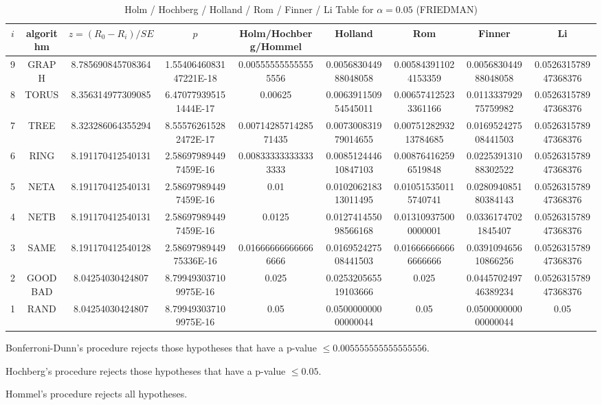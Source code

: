\documentclass[a4paper,10pt]{article}
\begin{document}
\begin{landscape}
\begin{table}[!htp]
\begin{tabular}{
|r|r|r|r|r|r|r|r|r|r|r|}
\end{tabular}
\end{table}

\newpage

\begin{table}[!htp]
\centering\scriptsize
\caption{Holm / Hochberg / Holland / Rom / Finner / Li Table for $\alpha=0.05$ (FRIEDMAN)}
\begin{tabular}{ccccccccc}
$i$&algorithm&$z=(R_0 - R_i)/SE$&$p$&Holm/Hochberg/Hommel&Holland&Rom&Finner&Li\\
\hline
9& GRAPH&8.785690845708364&1.5540646083147221E-18&0.005555555555555556&0.005683044988048058&0.005843911024153359&0.005683044988048058&0.052631578947368376\\
8& TORUS&8.356314977309085&6.470779395151444E-17&0.00625&0.006391150954545011&0.006574125233361166&0.011333792975759982&0.052631578947368376\\
7& TREE&8.323286064355294&8.555762615282472E-17&0.0071428571428571435&0.007300831979014655&0.0075128293213784685&0.016952427508441503&0.052631578947368376\\
6& RING&8.191170412540131&2.586979894497459E-16&0.008333333333333333&0.008512444610847103&0.008764162596519848&0.022539131088302522&0.052631578947368376\\
5& NETA&8.191170412540131&2.586979894497459E-16&0.01&0.010206218313011495&0.010515350115740741&0.028094085180384143&0.052631578947368376\\
4& NETB&8.191170412540131&2.586979894497459E-16&0.0125&0.012741455098566168&0.013109375000000001&0.03361747021845407&0.052631578947368376\\
3& SAME&8.191170412540128&2.5869798944975336E-16&0.016666666666666666&0.016952427508441503&0.016666666666666666&0.039109465610866256&0.052631578947368376\\
2& GOODBAD&8.04254030424807&8.799493037109975E-16&0.025&0.025320565519103666&0.025&0.044570249746389234&0.052631578947368376\\
1& RAND&8.04254030424807&8.799493037109975E-16&0.05&0.050000000000000044&0.05&0.050000000000000044&0.05\\
\hline
\end{tabular}
\end{table}
Bonferroni-Dunn's procedure rejects those hypotheses that have a p-value $\le0.005555555555555556$.


Hochberg's procedure rejects those hypotheses that have a p-value $\le0.05$.


Hommel's procedure rejects all hypotheses.



\end{landscape}
\end{document}
